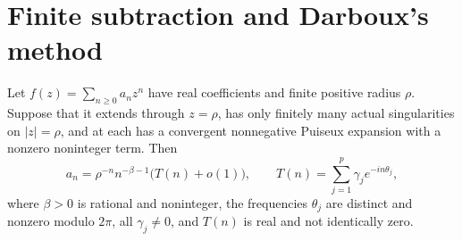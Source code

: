 \documentclass[11pt,a4paper]{article}
\theoremstyle{remark}\newtheorem*{ednote}{Editorial note (ProveIt, 2026-10-01)}
\begin{document}
\section{Finite subtraction and Darboux's method}
\begin{lemma}\label{lem:darboux}
Let $f(z)=\sum_{n\ge0}a_nz^n$ have real coefficients and finite positive radius $\rho$. Suppose that it extends through $z=\rho$, has only finitely many actual singularities on $|z|=\rho$, and at each has a convergent nonnegative Puiseux expansion with a nonzero noninteger term. Then
\begin{equation}\label{eq:asymptotic}
 a_n=\rho^{-n}n^{-\beta-1}\bigl(T(n)+o(1)\bigr),\qquad
 T(n)=\sum_{j=1}^p\gamma_j e^{-in\theta_j},
\end{equation}
where $\beta>0$ is rational and noninteger, the frequencies $\theta_j$ are distinct and nonzero modulo $2\pi$, all $\gamma_j\ne0$, and $T(n)$ is real and not identically zero.
\end{lemma}
\end{document}

